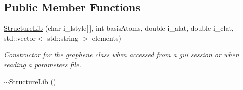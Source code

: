 \subsection*{Public Member Functions}
\begin{DoxyCompactItemize}
\item 
\hyperlink{class_structure_lib_a502fa21baaf8178d3863394a449e85d3}{Structure\+Lib} (char i\+\_\+lstyle\mbox{[}$\,$\mbox{]}, int basis\+Atoms, double i\+\_\+alat, double i\+\_\+clat, std\+::vector$<$ std\+::string $>$ elements)
\begin{DoxyCompactList}\small\item\em Constructor for the graphene class when accessed from a gui session or when reading a parameters file. \end{DoxyCompactList}\item 
\hyperlink{class_structure_lib_a40fe5cf7ef632df96ef10c523926ee44}{$\sim$\+Structure\+Lib} ()
\end{DoxyCompactItemize}
